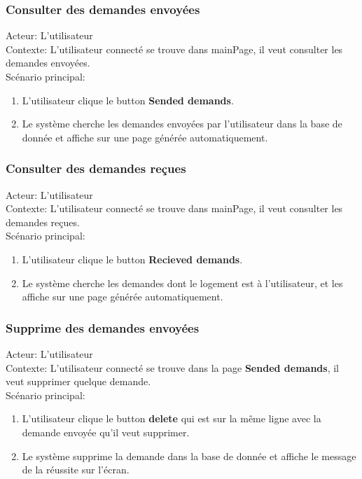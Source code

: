 \documentclass[14px]{article}
\begin{document}
\subsubsection{Consulter des demandes envoyées}
Acteur: L'utilisateur\\
Contexte: L'utilisateur connecté se trouve dans mainPage, il veut consulter les demandes envoyées.\\
Scénario principal:
\begin{enumerate}
	\item L'utilisateur clique le button \textbf{Sended demands}.
	\item Le système cherche les demandes envoyées par l'utilisateur dans la base de donnée et affiche sur une page générée automatiquement.
\end{enumerate}

\subsubsection{Consulter des demandes reçues}
Acteur: L'utilisateur\\
Contexte: L'utilisateur connecté se trouve dans mainPage, il veut consulter les demandes reçues.\\
Scénario principal:
\begin{enumerate}
	\item L'utilisateur clique le button \textbf{Recieved demands}.
	\item Le système cherche les demandes dont le logement est à l'utilisateur, et les affiche sur une page générée automatiquement.
\end{enumerate}

\subsubsection{Supprime des demandes envoyées}
Acteur: L'utilisateur\\
Contexte: L'utilisateur connecté se trouve dans la page \textbf{Sended demands}, il veut supprimer quelque demande.\\
Scénario principal:
\begin{enumerate}
	\item L'utilisateur clique le button \textbf{delete} qui est sur la même ligne avec la demande envoyée qu'il veut supprimer.
	\item Le système supprime la demande dans la base de donnée et affiche le message de la réussite sur l'écran.
\end{enumerate}
\end{document}

